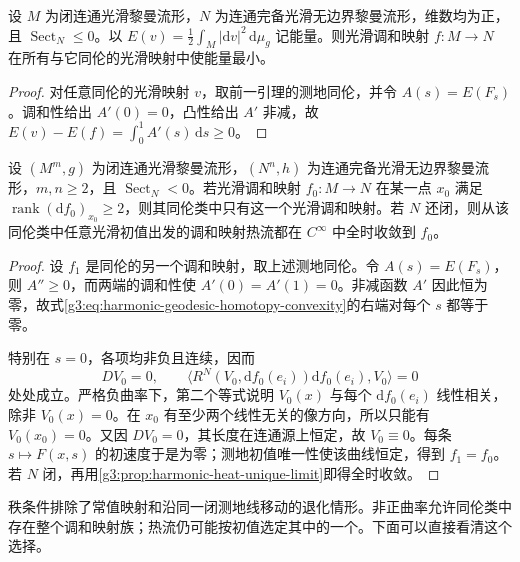 \begin{corollary}\label{g3:cor:nonpositive-harmonic-homotopy-minimum}
	设 \(M\) 为闭连通光滑黎曼流形，\(N\) 为连通完备光滑无边界黎曼流形，维数均为正，且 \(\operatorname{Sect}_N\le0\)。以 \(E(v)=\tfrac12\int_M|\mathrm dv|^2\,\mathrm d\mu_g\) 记能量。则光滑调和映射 \(f:M\to N\) 在所有与它同伦的光滑映射中使能量最小。
\end{corollary}
\begin{proof}
	对任意同伦的光滑映射 \(v\)，取前一引理的测地同伦，并令 \(A(s)=E(F_s)\)。调和性给出 \(A'(0)=0\)，凸性给出 \(A'\) 非减，故
	\(E(v)-E(f)=\int_0^1A'(s)\,\mathrm ds\ge0\)。
\end{proof}

\begin{theorem}\label{g3:thm:negative-target-harmonic-uniqueness}
	设 \((M^m,g)\) 为闭连通光滑黎曼流形，\((N^n,h)\) 为连通完备光滑无边界黎曼流形，\(m,n\ge2\)，且 \(\operatorname{Sect}_N<0\)。若光滑调和映射 \(f_0:M\to N\) 在某一点 \(x_0\) 满足 \(\operatorname{rank}(\mathrm df_0)_{x_0}\ge2\)，则其同伦类中只有这一个光滑调和映射。若 \(N\) 还闭，则从该同伦类中任意光滑初值出发的调和映射热流都在 \(C^\infty\) 中全时收敛到 \(f_0\)。
\end{theorem}
\begin{proof}
	设 \(f_1\) 是同伦的另一个调和映射，取上述测地同伦。令 \(A(s)=E(F_s)\)，则 \(A''\ge0\)，而两端的调和性使 \(A'(0)=A'(1)=0\)。非减函数 \(A'\) 因此恒为零，故式\eqref{g3:eq:harmonic-geodesic-homotopy-convexity}的右端对每个 \(s\) 都等于零。

	特别在 \(s=0\)，各项均非负且连续，因而
	\[
		DV_0=0,\qquad
		\langle R^N(V_0,\mathrm df_0(e_i))\mathrm df_0(e_i),V_0\rangle=0
	\]
	处处成立。严格负曲率下，第二个等式说明 \(V_0(x)\) 与每个 \(\mathrm df_0(e_i)\) 线性相关，除非 \(V_0(x)=0\)。在 \(x_0\) 有至少两个线性无关的像方向，所以只能有 \(V_0(x_0)=0\)。又因 \(DV_0=0\)，其长度在连通源上恒定，故 \(V_0\equiv0\)。每条 \(s\mapsto F(x,s)\) 的初速度于是为零；测地初值唯一性使该曲线恒定，得到 \(f_1=f_0\)。若 \(N\) 闭，再用\cref{g3:prop:harmonic-heat-unique-limit}即得全时收敛。
\end{proof}

秩条件排除了常值映射和沿同一闭测地线移动的退化情形。非正曲率允许同伦类中存在整个调和映射族；热流仍可能按初值选定其中的一个。下面可以直接看清这个选择。

